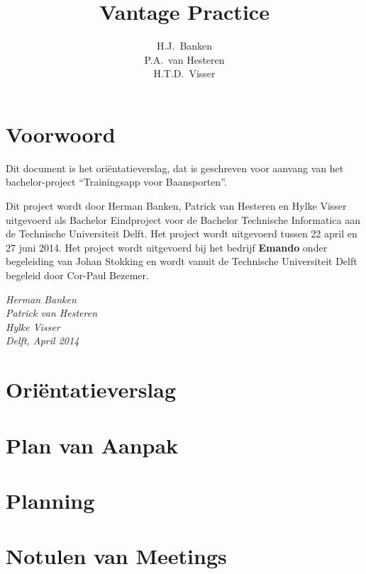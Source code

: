 \documentclass[dutch]{style/tudelft-report}
\begin{document}

\frontmatter

\title[Bachelorproject \\ ~ \\ Orientatieverslag]{Vantage Practice}
\author{H.J.\ Banken \\ P.A.\ van Hesteren \\ H.T.D.\ Visser}



\chapter{Voorwoord}
Dit document is het oriëntatieverslag, dat is geschreven voor aanvang van het bachelor-project “Trainingsapp voor Baansporten”. 

\bigskip

\noindent
Dit project wordt door Herman Banken, Patrick van Hesteren en Hylke Visser uitgevoerd als Bachelor Eindproject voor de Bachelor Technische Informatica aan de Technische Universiteit Delft. Het project wordt uitgevoerd tussen 22 april en 27 juni 2014. Het project wordt uitgevoerd bij het bedrijf \textbf{Emando} onder begeleiding van Johan Stokking en wordt vanuit de Technische Universiteit Delft begeleid door Cor-Paul Bezemer.

\bigskip

\begin{flushright}
{\makeatletter\itshape
    Herman Banken \\
    Patrick van Hesteren \\
    Hylke Visser \\
    Delft, April 2014
\makeatother}
\end{flushright}

\tableofcontents

\mainmatter

\chapter{Ori\"entatieverslag} \label{ch:orientatie} 

\appendix


\chapter{Plan van Aanpak} \label{ch:plan-van-aanpak} 

\chapter{Planning} \label{ch:planning} 

\chapter{Notulen van Meetings} \label{ch:notulen-van-meetings} 


\end{document}
